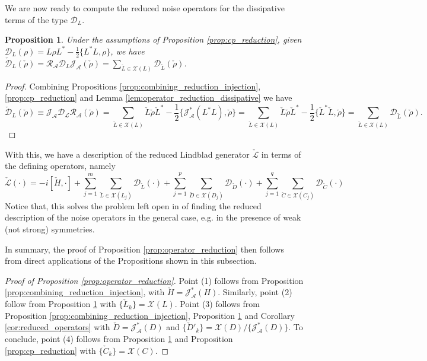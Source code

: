 \documentclass[aihp,12pt]{imsart}
\newcommand{\Dc}{\mathcal{D}}
\newcommand{\Jc}{\mathcal{J}}
\newcommand{\Rc}{\mathcal{R}}
\newcommand{\Lc}{\mathcal{L}}
\newcommand{\Xc}{\mathcal{X}}
\newcommand{\As}{\mathscr{A}}
\theoremstyle{theorem}
\newtheorem{proposition}{Proposition}
\theoremstyle{definition}
\theoremstyle{remark}
\begin{document}
We are now ready to compute the reduced noise operators for the dissipative terms of the type $\Dc_{L}$. 
\begin{proposition}
\label{prop:dissipative}
    Under the assumptions of Proposition \ref{prop:cp_reduction}, given $\Dc_{L}(\rho) = L\rho L^* -\frac{1}{2}\{L^* L, \rho\}$, we have $\check{\Dc}_{L}(\check{\rho}) = \Rc_\As \Dc_L \Jc_\As(\check{\rho}) = \sum_{\check{L}\in\Xc(L)} \Dc_{\check{L}}(\check{\rho})$. 
\end{proposition}
\begin{proof}
    Combining Propositions \ref{prop:combining_reduction_injection}, \ref{prop:cp_reduction} and Lemma \ref{lem:operator_reduction_dissipative} we have \[\check{\Dc}_{L}(\check{\rho})\equiv \Jc_\As \Dc_\Lc \Rc_\As (\check{\rho}) = \sum_{\check{L}\in\Xc(L)} \check{L}\check{\rho}\check{L}^* -\frac{1}{2}\{\Jc_\As^*(L^* L),\check{\rho}\} = \sum_{\check{L}\in\Xc(L)} \check{L}\check{\rho}\check{L}^* -\frac{1}{2}\{\check{L}^* \check{L},\check{\rho}\} = \sum_{\check{L}\in\Xc(L)} \Dc_{\check{L}}(\check{\rho}).\]
\end{proof}
With this, we have a description of the reduced Lindblad generator $\check{\Lc}$ in terms of the defining operators, namely 
\begin{equation}
    \check{\Lc}(\cdot) = -i [\check{H},\cdot] + \sum_{j=1}^m \sum_{\check{L}\in\Xc(L_j)} \Dc_{\check{L}}(\cdot) + \sum_{j=1}^p \sum_{\check{D}\in\Xc(D_j)} \Dc_{\check{D}}(\cdot) + \sum_{j=1}^q \sum_{\check{C}\in\Xc(C_j)} \Dc_{\check{C}}(\cdot)
\end{equation}
Notice that, this solves the problem left open in \cite{prxq2024} of finding the reduced description of the noise operators in the general case, e.g. in the presence of weak (not strong) symmetries. 

In summary, the proof of Proposition \ref{prop:operator_reduction} then follows from direct applications of the Propositions shown in this subsection.
\begin{proof}[Proof of Proposition \ref{prop:operator_reduction}]
    Point (1) follows from Proposition \ref{prop:combining_reduction_injection}, with $\check{H} = \Jc_\As^*(H)$. Similarly, point (2) follow from Proposition \ref{prop:dissipative} with $\{\check{L}_k\} = \Xc(L)$.
    Point (3) follows from Proposition \ref{prop:combining_reduction_injection}, Proposition \ref{prop:dissipative} and Corollary \ref{cor:reduced_operators} with $\check{D} = \Jc_\As^*(D)$ and $\{\check{D}'_k\} = \Xc(D)/\{\Jc_\As^*(D)\}$. 
    To conclude, point (4) follows from Proposition \ref{prop:dissipative} and Proposition \ref{prop:cp_reduction} with $\{\check{C}_k\} = \Xc(C)$.
\end{proof}
\end{document}
